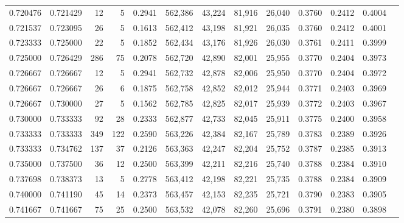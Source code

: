 \begin{tabular}{rrrrrrrrrrrrr}
0.720476 & 0.721429 &     12 &      5 &                                     0.2941 & 562,386 &  43,224 &  81,916 &  26,040 & 0.3760 & 0.2412 & 0.4004 \\
0.721537 & 0.723095 &     26 &      5 &                                     0.1613 & 562,412 &  43,198 &  81,921 &  26,035 & 0.3760 & 0.2412 & 0.4001 \\
0.723333 & 0.725000 &     22 &      5 &                                     0.1852 & 562,434 &  43,176 &  81,926 &  26,030 & 0.3761 & 0.2411 & 0.3999 \\
0.725000 & 0.726429 &    286 &     75 &                                     0.2078 & 562,720 &  42,890 &  82,001 &  25,955 & 0.3770 & 0.2404 & 0.3973 \\
0.726667 & 0.726667 &     12 &      5 &                                     0.2941 & 562,732 &  42,878 &  82,006 &  25,950 & 0.3770 & 0.2404 & 0.3972 \\
0.726667 & 0.726667 &     26 &      6 &                                     0.1875 & 562,758 &  42,852 &  82,012 &  25,944 & 0.3771 & 0.2403 & 0.3969 \\
0.726667 & 0.730000 &     27 &      5 &                                     0.1562 & 562,785 &  42,825 &  82,017 &  25,939 & 0.3772 & 0.2403 & 0.3967 \\
0.730000 & 0.733333 &     92 &     28 &                                     0.2333 & 562,877 &  42,733 &  82,045 &  25,911 & 0.3775 & 0.2400 & 0.3958 \\
0.733333 & 0.733333 &    349 &    122 &                                     0.2590 & 563,226 &  42,384 &  82,167 &  25,789 & 0.3783 & 0.2389 & 0.3926 \\
0.733333 & 0.734762 &    137 &     37 &                                     0.2126 & 563,363 &  42,247 &  82,204 &  25,752 & 0.3787 & 0.2385 & 0.3913 \\
0.735000 & 0.737500 &     36 &     12 &                                     0.2500 & 563,399 &  42,211 &  82,216 &  25,740 & 0.3788 & 0.2384 & 0.3910 \\
0.737698 & 0.738373 &     13 &      5 &                                     0.2778 & 563,412 &  42,198 &  82,221 &  25,735 & 0.3788 & 0.2384 & 0.3909 \\
0.740000 & 0.741190 &     45 &     14 &                                     0.2373 & 563,457 &  42,153 &  82,235 &  25,721 & 0.3790 & 0.2383 & 0.3905 \\
0.741667 & 0.741667 &     75 &     25 &                                     0.2500 & 563,532 &  42,078 &  82,260 &  25,696 & 0.3791 & 0.2380 & 0.3898 \\

\end{tabular}
